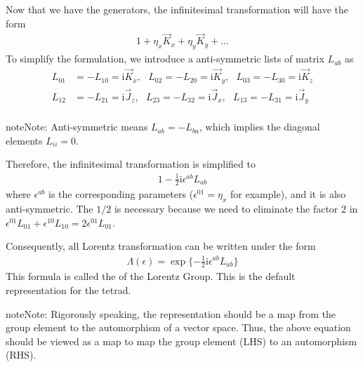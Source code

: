 \documentclass[letterpaper,10pt,english]{sphinxmanual}
\begin{document}
Now that we have the generators, the infinitesimal transformation will have the form
\begin{equation*}
\begin{split}1 + \eta_x\vec K_x + \eta_y \vec K_y + ...\end{split}
\end{equation*}
To simplify the formulation, we introduce a anti-symmetric lists of matrix \(L_{ab}\) as
\begin{equation*}
\begin{split}L_{01} &= -L_{10} = \mathrm{i}\vec K_x,\ \ \ L_{02} = -L_{20} = \mathrm{i}\vec K_y,\ \ \ L_{03} = -L_{30} = \mathrm{i}\vec K_z\\
L_{12} &= -L_{21} = \mathrm{i}\vec J_z,\ \ \ L_{23} = -L_{32} = \mathrm{i}\vec J_x,\ \ \ L_{13} = -L_{31} = \mathrm{i}\vec J_y\\\end{split}
\end{equation*}
\begin{sphinxadmonition}{note}{Note:}
Anti-symmetric means \(L_{ab} = -L_{ba}\), which implies the diagonal elements \(L_{ii} = 0\).
\end{sphinxadmonition}

Therefore, the infinitesimal transformation is simplified to
\begin{equation*}
\begin{split}1 - \frac{1}{2}\mathrm{i}\epsilon^{ab}L_{ab}\end{split}
\end{equation*}
where \(\epsilon^{ab}\) is the corresponding parameters (\(\epsilon^{01} = \eta_x\) for example), and it is also anti-symmetric. The \(1/2\) is necessary because we need to eliminate the factor \(2\) in \(\epsilon^{01}L_{01} + \epsilon^{10}L_{10} = 2\epsilon^{01}L_{01}\).

Consequently, all Lorentz transformation can be written under the form
\begin{equation*}
\begin{split}\varLambda(\epsilon) = \exp\{-\frac{1}{2}\mathrm{i}\epsilon^{ab}L_{ab}\}\end{split}
\end{equation*}
This formula is called the  of the Lorentz Group. This is the default representation for the tetrad.

\begin{sphinxadmonition}{note}{Note:}
Rigorously speaking, the representation should be a map from the group element to the automorphism of a vector space. Thus, the above equation should be viewed as a map to map the group element (LHS) to an automorphism (RHS).
\end{sphinxadmonition}
\end{document}
